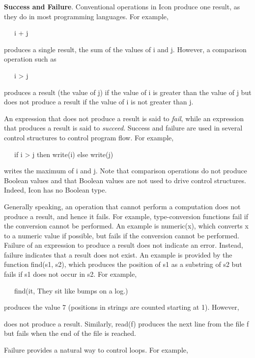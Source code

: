 \textbf{Success and Failure}. Conventional operations in Icon
produce one result, as they do in most programming languages. For
example,

{\ttfamily\mdseries
\ \ \ i + j}

\noindent produces a single result, the sum of the values of i and
j. However, a comparison operation such as

{\ttfamily\mdseries
\ \ \ i {\textgreater} j}

\noindent produces a result (the value of j) if the value of i is
greater than the value of j but does not produce a result if the value
of i is not greater than j.

An expression that does not produce a result is said to \textit{fail},
while an expression that produces a result is said to
\textit{succeed}. Success and failure are used in several control
structures to control program flow. For example,

{\ttfamily\mdseries
\ \ \ if i {\textgreater} j then write(i) else write(j)}

\noindent writes the maximum of i and j. Note that comparison
operations do not produce Boolean values and that Boolean values are
not used to drive control structures. Indeed, Icon has no Boolean
type.

Generally speaking, an operation that cannot perform a computation
does not produce a result, and hence it fails. For example,
type-conversion functions fail if the conversion cannot be
performed. An example is numeric(x), which converts x to a numeric
value if possible, but fails if the conversion cannot be
performed. Failure of an expression to produce a result does not
indicate an error. Instead, failure indicates that a result does not
exist. An example is provided by the function find(s1, s2), which
produces the position of s1 as a substring of s2 but fails if s1 does
not occur in s2.  For example,

{\ttfamily\mdseries
\ \ \ find({\textquotedbl}it{\textquotedbl}, {\textquotedbl}They sit like bumps on a log.{\textquotedbl})}

\noindent
produces the value 7 (positions in strings are counted starting at 1). However,


\noindent
does not produce a result. Similarly, read(f) produces the next line from the file f but fails when the end of the file
is reached.


Failure provides a natural way to control loops. For example,

